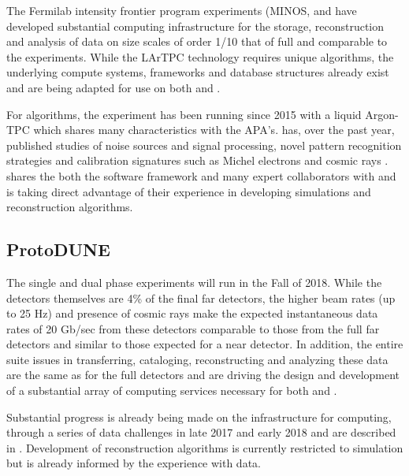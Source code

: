 The Fermilab intensity frontier program experiments (MINOS\cite{minos},  \cite{minerva} and  \cite{nova} have developed substantial computing infrastructure for the storage, reconstruction and analysis of data on size scales of order 1/10 that of full   and comparable to the  experiments. While the LArTPC technology requires unique algorithms, the underlying compute systems, frameworks and database structures already exist and are being adapted for use on both  and  .

For algorithms, the  \cite{Acciarri:2016smi} experiment has been running since 2015 with a liquid Argon-TPC which shares many characteristics with the   APA's.     has, over the past year, published studies of noise sources and signal processing\cite{Acciarri:2017sde,Adams:2018dra}, novel pattern recognition strategies \cite{Acciarri:2016ryt,Acciarri:2017hat} and calibration signatures such as Michel electrons and cosmic rays \cite{Acciarri:2017sjy,Acciarri:2017sde}.    shares the both the \larsoft software framework and many expert collaborators with   and is taking direct advantage of their experience in developing simulations and reconstruction algorithms.


\subsection{ProtoDUNE}\label{sw:PD-planning}

The  single and dual phase experiments will run in the Fall of 2018.  While the detectors themselves are 4\% of the final far detectors, the higher beam rates (up to 25 Hz) and presence of cosmic rays make the expected instantaneous data rates of 20 Gb/sec from these detectors comparable to those from the full far detectors and similar to those expected for a near detector. 
In addition, the entire suite issues in transferring, cataloging, reconstructing and analyzing these data are the same as for the full detectors and are driving the design and development of a substantial array of computing services necessary for both  and  .

Substantial progress is already being made on the infrastructure for computing, through a series of data challenges in late 2017 and early 2018 and are described in 
.  Development of reconstruction algorithms is currently restricted to simulation but is already informed by the experience with   data.


